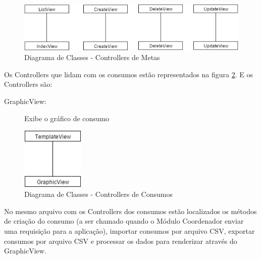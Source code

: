 \begin{figure}
\centering
\includegraphics[width=14cm,keepaspectratio]{figuras/diagrama_cont_goal.png}
\caption{\label{fig:diagrama-cont-goal} Diagrama de Classes - Controllers de Metas}
\end{figure}

Os Controllers que lidam com os consumos estão representados na figura \ref{fig:diagrama-cont-consumption}. E os Controllers são:
\begin{description}
	\item[GraphicView:] Exibe o gráfico de consumo
\end{description} 

\begin{figure}
\centering
\includegraphics[width=3cm,keepaspectratio]{figuras/diagrama_cont_consumption.png}
\caption{\label{fig:diagrama-cont-consumption} Diagrama de Classes - Controllers de Consumos}
\end{figure}

No mesmo arquivo com os Controllers dos consumos estão localizados os métodos de criação do consumo (a ser chamado quando o Módulo Coordenador enviar uma requisição para a aplicação), importar consumos por arquivo CSV, exportar consumos por arquivo CSV e processar os dados para renderizar através do GraphicView.